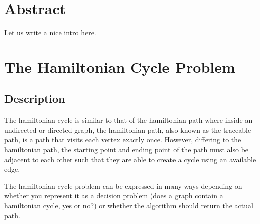 \section{Abstract}

Let us write a nice intro here.

\section{The Hamiltonian Cycle Problem}

\subsection{Description}

The hamiltonian cycle is similar to that of the hamiltonian path where inside an
undirected or directed graph, the hamiltonian path, also known as the traceable
path, is a path that visits each vertex exactly once. However, differing to the
hamiltonian path, the starting point and ending point of the path must also be
adjacent to each other such that they are able to create a cycle using an
available edge. 

The hamiltonian cycle problem can be expressed in many ways depending on whether
you represent it as a decision problem (does a graph contain a hamiltonian
cycle, yes or no?) or whether the algorithm should return the actual path.

\printbibliography

